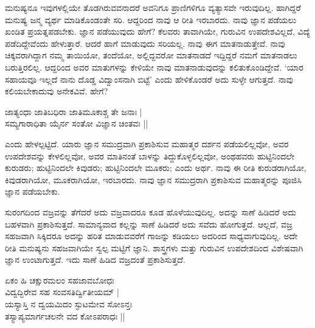 ಮನುಷ್ಯನೂ ಇವುಗಳಲ್ಲಿಯೇ 
ತೊಡಗಿರುವವನಾದರೆ ಅವನಿಗೂ 
ಪ್ರಾಣಿಗಳಿಗೂ ವ್ಯತ್ಯಾಸವೇ 
ಇರುವುದಿಲ್ಲ. ಹಾಗಿದ್ದರೆ 
ಮನುಷ್ಯ ಜನ್ಮ ವ್ಯರ್ಥ 
ಮಾಡಿಕೊಂಡಂತೇ ಸರಿ. ಆದ್ದರಿಂದ 
ನಾವು ಆ ರೀತಿ ಇರಬಾರದು. ನಾವು 
ಜ್ಞಾನ ಪಡೆಯಲು ಖಂಡಿತ 
ಪ್ರಯತ್ನಪಡಬೇಕು. ಜ್ಞಾನ 
ಪಡೆಯುವುದು ಹೇಗೆ? ಕೆಲವರು 
ತಾವಾಗಿಯೇ, ಗುರುವಿನ 
ಉಪದೇಶವಿಲ್ಲದೆ, ವಿದ್ಯೆ  
ಪಡೆದಿದ್ದೇವೆಂದು 
ಹೇಳುತ್ತಾರೆ. ಆದರೆ ಹಾಗೆ 
ಮಾಡುವುದು ಸರಿಯಲ್ಲ. ನಾವು ಈಗ 
ಮಾತನಾಡುತ್ತೇವೆ. ನಾವು 
ಚಿಕ್ಕವರಾಗಿದ್ದಾಗ ನಮ್ಮ 
ತಾಯಿಯೋ, ತಂದೆಯೋ, 
ಅಲ್ಲಿದ್ದವರೋ ಮಾತನಾಡದೆ 
ಇದ್ದಿದ್ದರೆ ನಮಗೆ ಮಾತನಾಡಲು 
ಬರುತ್ತಿರಲಿಲ್ಲ. ಆದ್ದರಿಂದ 
ಅವರ ಮಾತುಗಳನ್ನು ಕೇಳಿಯೇ 
ನಾವು ಮಾತನಾಡುವುದನ್ನು 
ಕಲಿತುಕೊಂಡಿದ್ದೇವೆ. `ಯಾರ 
ಸಹಾಯವೂ ಇಲ್ಲದೆ ನಾನು ದೊಡ್ಡ 
ವಿದ್ವಾಂಸನಾಗಿ ಬಿಟ್ಟೆ' ಎಂದು 
ಹೇಳಿಕೊಂಡರೆ ಅದು ಸುಳ್ಳೇ ಆಗುತ್ತದೆ. ನಾವು ಕಲಿಯಬೇಕಾದುವು ಅನೇಕವಿವೆ. ಹೇಗೆ?

\begin{shloka}
ಜಾತ್ಯಂಧಾ ಜಾತಿಬಧಿರಾ ಜಾತಿಮೂಕಾಶ್ಚ ತೇ ಜನಾಃ |\\
ಸಮ್ಯಗಾರಾಧಿತಾ ಯೈರ್ನ ಸಂತೋ ವಿಜ್ಞಾನ ಚಿಂತವಃ ||
\end{shloka}

ಎಂದು ಹೇಳಲ್ಪಟ್ಟಿದೆ. ಯಾರು 
ಜ್ಞಾನ ಸಮುದ್ರವಾಗಿ 
ಪ್ರಕಾಶಿಸುವ ಮಹಾತ್ಮರ ದರ್ಶನ 
ಪಡೆಯಲಿಲ್ಲವೋ, ಅವರ 
ಉಪದೇಶವನ್ನು ಕೇಳಲಿಲ್ಲವೋ, 
ಅವರ ಮಾತಿನಂತೆ ಬಾಳನ್ನು 
ತಿದ್ದುಕೊಳ್ಳಲಿಲ್ಲವೋ, 
ಅಂಥಹವರು ಹುಟ್ಟಿನಿಂದಲೇ 
ಕುರುಡರು; ಹುಟ್ಟಿನಿಂದಲೇ 
ಕಿವುಡರು; ಹುಟ್ಟಿನಿಂದಲೇ 
ಮೂಕರು; ಎಂದು ಅರ್ಥ. ನಾವು ಈ 
ರೀತಿ ಕುರುಡರಾಗಿಯೋ, 
ಕಿವುಡರಾಗಿಯೋ, ಮೂಕರಾಗಿಯೋ, 
ಇರಬಾರದು. ನಾವು ಜ್ಞಾನ 
ಸಮುದ್ರರಾಗಿ ಪ್ರಕಾಶಿಸುವ ಮಹಾತ್ಮರನ್ನು ಪೂಜಿಸಿ ಜ್ಞಾನ ಪಡೆಯಬೇಕು.

ಸುರಂಗದಿಂದ ವಜ್ರವನ್ನು 
ತೆಗೆದರೆ ಅದು ವಜ್ರವಾದರೂ ಕೂಡ 
ಹೊಳೆಯುವುದಿಲ್ಲ. ಅದನ್ನು 
ಸಾಣೆ ಹಿಡಿದರೆ ಅದು ಬಹಳವಾಗಿ 
ಪ್ರಕಾಶಿಸುತ್ತದೆ. 
ಸಾಮಾನ್ಯವಾದ ಕಲ್ಲನ್ನು ಸಾಣೆ 
ಹಿಡಿದರೆ ಅದು ಸವೆದು 
ಹೋಗುತ್ತದೆ. ಆಲ್ಲದೆ, ವಜ್ರ 
ಸಹಜವಾಗಿ ಸಿಕ್ಕಿದರೂ ಅದನ್ನು 
ಹರಿತ ಮಾಡುವವರೆಗೆ ಗಾಜನ್ನು 
ಕಡಿಯಲು ಅದರಿಂದ 
ಸಾಧ್ಯವಾಗುವುದಿಲ್ಲ. ಅದೇ 
ರೀತಿ ಮನುಷ್ಯನು ಸಹಜವಾಗಿಯೇ 
ಸ್ವಲ್ಪ ಮಟ್ಟಿಗೆ ಜ್ಞಾನಿ. 
ಶಾಸ್ತ್ರಗಳು ಮತ್ತು ಗುರುವಿನ 
ಉಪದೇಶದಿಂದ ವಿಶೇಷವಾಗಿ ಜ್ಞಾನ 
ಉಂಟಾಗುತ್ತದೆ. ಇದು ಸಾಣೆ ಹಿಡಿದ ವಜ್ರದಂತೆ ಪ್ರಕಾಶಿಸುತ್ತದೆ.

\begin{shloka}
ಏಕಂ ಹಿ ಚಕ್ಷುರಮಲಂ ಸಹಜಾವಬೋಧಃ\\
ವಿದ್ವದ್ಭಿರೇವ ಸಹ ಸಂವಸತಿರ್ದ್ವಿತೀಯಮ್ |\\
ಯಸ್ಯಾಸ್ತಿ ನ ದ್ವಯಮಿದಂ ಸ್ಫುಟಮೇವ ಸೋಽನ್ತಃ\\
ತಸ್ಯಾಪ್ಯಮಾರ್ಗಚಲನೇ ವದ ಕೋಽಪರಾಧಃ ||
\end{shloka}


